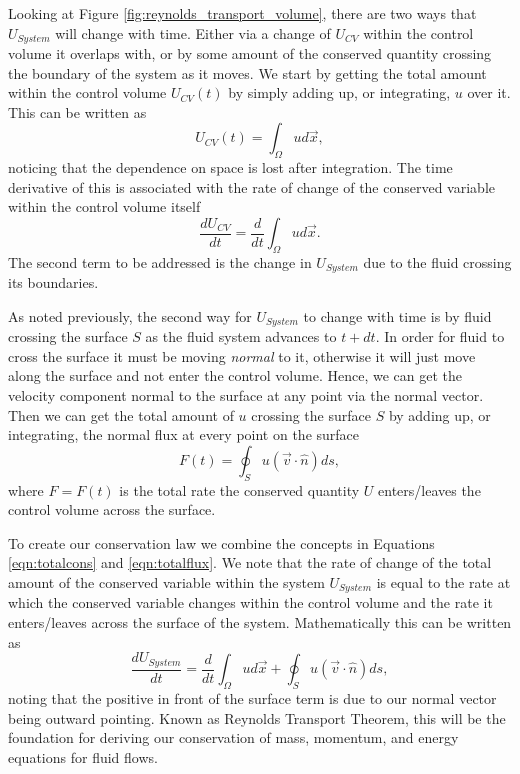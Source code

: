 Looking at Figure \ref{fig:reynolds_transport_volume}, there are two ways that $U_{System}$ will change with time. Either via a change of $U_{CV}$ within the control volume it overlaps with, or by some amount of the conserved quantity crossing the boundary of the system as it moves. We start by getting the total amount within the control volume $U_{CV}(t)$ by simply adding up, or integrating, $u$ over it. This can be written as
\begin{equation}
	\label{eqn:totalcons}
	U_{CV}(t) = \int_\Omega u d\vec{x},
\end{equation}
noticing that the dependence on space is lost after integration. The time derivative of this is associated with the rate of change of the conserved variable within the control volume itself
\begin{equation}
	\label{eqn:totalcons}
	\frac{dU_{CV}}{dt} = \frac{d}{dt}\int_\Omega u d\vec{x}.
\end{equation}
The second term to be addressed is the change in $U_{System}$ due to the fluid crossing its boundaries.

As noted previously, the second way for $U_{System}$ to change with time is by fluid crossing the surface $S$ as the fluid system advances to $t+dt$. In order for fluid to cross the surface it must be moving {\it normal} to it, otherwise it will just move along the surface and not enter the control volume. Hence, we can get the velocity component normal to the surface at any point via the normal vector. Then we can get the total amount of $u$ crossing the surface $S$ by adding up, or integrating, the normal flux at every point on the surface
\begin{equation}
	\label{eqn:totalflux}
	F(t) = \oint_S u (\vec{v} \cdot \hat{n}) ds,
\end{equation}
where $F = F(t)$ is the total rate the conserved quantity $U$ enters/leaves the control volume across the surface.

To create our conservation law we combine the concepts in Equations \ref{eqn:totalcons} and \ref{eqn:totalflux}. We note that the rate of change of the total amount of the conserved variable within the system $U_{System}$ is equal to the rate at which the conserved variable changes within the control volume and the rate it enters/leaves across the surface of the system. Mathematically this can be written as
\begin{equation}
	\frac{dU_{System}}{dt} = \frac{d}{dt}\int_\Omega u d\vec{x} + \oint_S u (\vec{v} \cdot \hat{n}) ds,
\end{equation}
noting that the positive in front of the surface term is due to our normal vector being outward pointing. Known as Reynolds Transport Theorem, this will be the foundation for deriving our conservation of mass, momentum, and energy equations for fluid flows.

